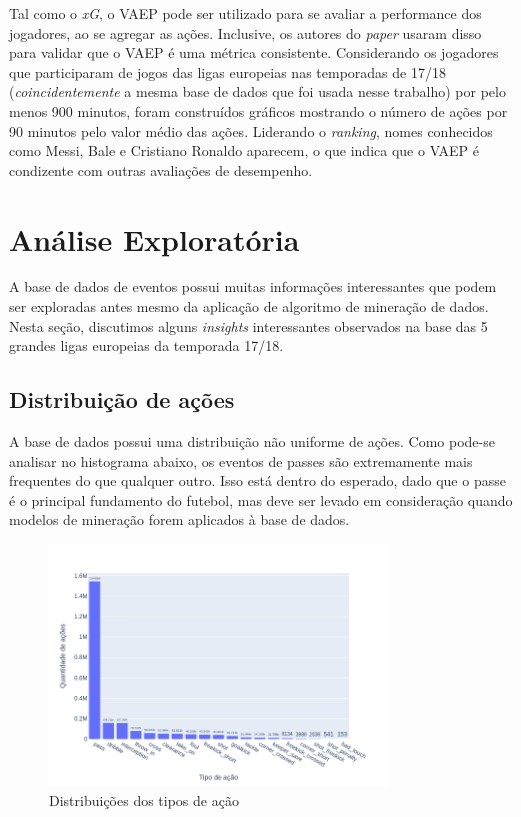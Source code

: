 \documentclass{article}
\begin{document}
Tal como o \textit{xG}, o VAEP pode ser utilizado para se avaliar a performance
dos jogadores, ao se agregar as ações. Inclusive, os autores do \textit{paper}
usaram disso para validar que o VAEP é uma métrica consistente. Considerando os
jogadores que participaram de jogos das ligas europeias nas temporadas de 17/18
(\textit{coincidentemente} a mesma base de dados que foi usada nesse trabalho)
por pelo menos 900 minutos, foram construídos gráficos mostrando o número de
ações por 90 minutos pelo valor médio das ações. Liderando o \textit{ranking},
nomes conhecidos como Messi, Bale e Cristiano Ronaldo aparecem, o que indica que
o VAEP é condizente com outras avaliações de desempenho.

\section{Análise Exploratória}

A base de dados de eventos possui muitas informações interessantes que podem
ser exploradas antes mesmo da aplicação
de algoritmo de mineração de dados. Nesta seção, discutimos alguns
\textit{insights} interessantes observados na base das 5 grandes ligas
europeias da temporada 17/18.

\subsection{Distribuição de ações}

A base de dados possui uma distribuição não uniforme de ações. Como pode-se
analisar no histograma abaixo, os eventos de passes são extremamente mais
frequentes do que qualquer outro. Isso está dentro do esperado, dado que o
passe é o principal fundamento do futebol, mas deve ser levado em consideração
quando modelos de mineração forem aplicados à base de dados.

\begin{figure}[H]
	\centering
	\includegraphics[width=0.8\textwidth]{images/action_distribution.png}
	\caption{Distribuições dos tipos de ação}
	\label{fig:action_distribution}
\end{figure}
\end{document}
